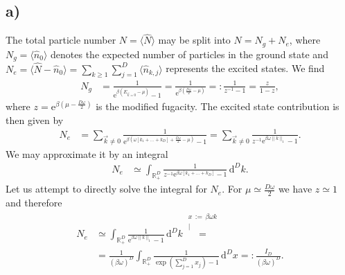 \documentclass[english, parskip=full]{scrartcl}
\newcommand{\bra}{}
\newcommand{\kom}{}
\newcommand{\intx}{}
\newcommand{\intr}{}
\newcommand{\kla}{}
\newcommand{\e}{\text{e}}
\begin{document}
\subsection*{a)}
The total particle number $N = \bra\langle \hat{N} \rangle$ may be split into $N = N_g + N_e$, where $N_g = \bra\langle \hat{n}_0 \rangle$ denotes the expected number of particles in the ground state and $N_e = \bra\langle \hat{N} - \hat{n}_0 \rangle = \sum_{k\ge 1} \sum_{j=1}^D \bra\langle \hat{n}_{k,j} \rangle$ represents the excited states.
We find
\begin{align}
N_g &= \frac{1}{\e^{\beta \kla\left( E_{\vec{k}=0} - \mu  \right)} - 1} = \frac{1}{\e^{\beta\kla\left( \frac{D\omega}{2} - \mu  \right)}} =: \frac{1}{z^{-1} - 1} = \frac{z}{1 - z},
\end{align}
where $z = \e^{\beta \kla\left( \mu - \frac{D\omega}{2} \right)}$ is the modified fugacity.
The excited state contribution is then given by
\begin{align}
N_e &= \sum_{\vec{k}\neq 0} \frac{1}{\e^{\beta \kla\left( \omega [k_1 + \dots + k_D] + \frac{D\omega}{2} - \mu  \right)} - 1} = \sum_{\vec{k}\neq 0} \frac{1}{z^{-1} \e^{\beta\omega \|k\|_1} - 1}.
\end{align}
We may approximate it by an integral
\begin{align}
N_e &\simeq \int_{\mathbb{R}^D_+} \frac{1}{z^{-1} \e^{\beta\omega [k_1 + \dots + k_D]} - 1} \, \mathrm{d}^{D}k.
\end{align}
Let us attempt to directly solve the integral for $N_e$.
For $\mu\simeq \frac{D\omega}{2}$ we have $z\simeq 1$ and therefore
\begin{align}
N_e &\simeq \intr\int_{\mathbb{R}^{D}_+} \frac{1}{\e^{\beta\omega \|k\|_1} - 1} \, \mathrm{d}^{D}k \kom\overset{\substack{{x\,:=\,\beta\omega k} \\ |}}{=} \\
&= \frac{1}{(\beta\omega)^D} \intr\int_{\mathbb{R}^{D}_+} \frac{1}{\exp\kla\left( \sum_{j=1}^D x_j \right) - 1} \, \mathrm{d}^{D}x =: \frac{I_D}{(\beta\omega)^D}.
\end{align}
\end{document}
